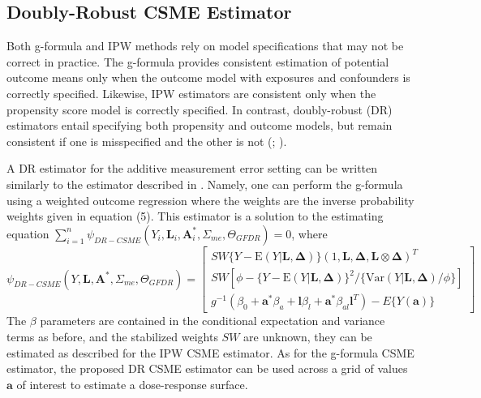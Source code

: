 \documentclass[useAMS,usenatbib,referee]{biom}
\begin{document}
\subsection{Doubly-Robust CSME Estimator}

Both g-formula and IPW methods rely on model specifications that may not be correct in practice. The g-formula provides consistent estimation of potential outcome means only when the outcome model with exposures and confounders is correctly specified. Likewise, IPW estimators are consistent only when the propensity score model is correctly specified. In contrast, doubly-robust (DR) estimators entail specifying both propensity and outcome models, but remain consistent if one is misspecified and the other is not (\citealp*{robins1994}; \citealp{lunceford2004,bang2005}).

A DR estimator for the additive measurement error setting can be written similarly to the estimator described in \citet{hirano2001}. Namely, one can perform the g-formula using a weighted outcome regression where the weights are the inverse probability weights given in equation (5). This estimator is a solution to the estimating equation $\sum_{i=1}^{n} \psi_{DR-CSME}(Y_{i}, \bm{L}_{i}, \bm{A}_{i}^{*}, \Sigma_{me}, \Theta_{GFDR}) = 0$, where
\begin{equation}
    \psi_{DR-CSME}(Y, \bm{L}, \bm{A}^{*}, \Sigma_{me}, \Theta_{GFDR}) =
    \begin{bmatrix}
       SW\{ Y - \text{E}(Y | \bm{L}, \bm{\Delta}) \} (1, \bm{L}, \bm{\Delta}, \bm{L} \otimes \bm{\Delta})^{T} \\
        SW[\phi - \{ Y - \text{E}(Y | \bm{L}, \bm{\Delta}) \}^{2} / \{ \text{Var}(Y | \bm{L}, \bm{\Delta}) / \phi \}] \\
        g^{-1}(\beta_{0} + \bm{a}^{*}\beta_{a} + \bm{l}\beta_{l} +
        \bm{a}^{*}\beta_{al}\bm{l}^{T}) - E \{ Y(\bm{a}) \}
    \end{bmatrix}
\end{equation}
The $\beta$ parameters are contained in the conditional expectation and variance terms as before, and the stabilized weights $SW$ are unknown, they can be estimated as described for the IPW CSME estimator. As for the g-formula CSME estimator, the proposed DR CSME estimator can be used across a grid of values $\bm{a}$ of interest to estimate a dose-response surface.
\end{document}
